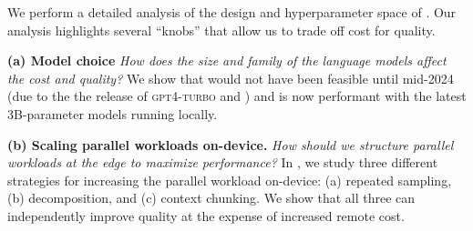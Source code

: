 
We perform a detailed analysis of the design and hyperparameter space of \system. 
Our analysis highlights several ``knobs'' that allow us to trade off cost for quality. 

\textbf{(a) Model choice} \textit{How does the size and family of the language models affect the cost and quality?} We show that \system would not have been feasible until mid-2024 (due to the  the release of \textsc{gpt4-turbo} and \llamathreeone) and is now performant with the latest 3B-parameter models running locally.



\textbf{(b) Scaling parallel workloads on-device.} \textit{How should we structure parallel workloads at the edge to maximize performance?}  In , we study three different strategies for increasing the parallel workload on-device: (a)  repeated sampling, (b) decomposition, and (c) context chunking. 
  We show that all three can independently improve quality at the expense of increased remote cost. 

